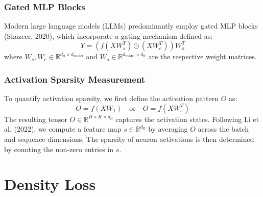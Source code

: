 \documentclass[11pt,a4paper]{article}
\begin{document}
\subsubsection*{Gated MLP Blocks}
Modern large language models (LLMs) predominantly employ gated MLP blocks (Shazeer, 2020), which incorporate a gating mechanism defined as: \[Y = \left( f(X W_s^T) \odot (X W_e^T) \right) W_o^T\] where \(W_s, W_e \in \mathbb{R}^{d_{\text{ff}} \times d_{\text{model}}}\) and \(W_o \in \mathbb{R}^{d_{\text{model}} \times d_{\text{ff}}}\) are the respective weight matrices.
\subsubsection*{Activation Sparsity Measurement}
To quantify activation sparsity, we first define the activation pattern \(O\) as: \[O = f(X W_1) \quad \text{or} \quad O = f(X W_s^T)\] The resulting tensor \(O \in \mathbb{R}^{B \times K \times d_{\text{ff}}}\) captures the activation states. Following Li et al. (2022), we compute a feature map \(s \in \mathbb{R}^{d_{\text{ff}}}\) by averaging \(O\) across the batch and sequence dimensions. The sparsity of neuron activations is then determined by counting the non-zero entries in \(s\).




\section{Density Loss}
\end{document}

